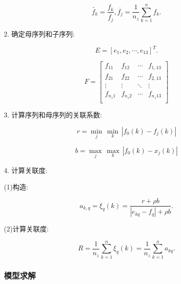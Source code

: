 \begin{equation}
    \widetilde{{{f}_{k}}}=\frac{{{f}_{k}}}{\overline{{{f}_{j}}}},\overline{{{f}_{j}}}=\frac{1}{{{n}_{z}}}\sum\limits_{k=1}^{n}{{{f}_{k}}}.
\end{equation}

2. 确定母序列和子序列:

\begin{equation}
    E={{\left[ {{e}_{1}},{{e}_{2}},\cdots ,{{e}_{13}} \right]}^{T}}.
\end{equation}

\begin{equation}
    F=\left[ \begin{matrix}
		{{f}_{11}} & {{f}_{12}} & \cdots  & {{f}_{1,13}}  \\
		{{f}_{21}} & {{f}_{22}} & \cdots  & {{f}_{2,13}}  \\
		\vdots  & \vdots  & \ddots  & \vdots   \\
		{{f}_{{{n}_{z}}1}} & {{f}_{{{n}_{z}}2}} & \cdots  & {{f}_{{{n}_{z}}13}}  \\
	\end{matrix} \right]
\end{equation}

3. 计算序列和母序列的关联系数:


\begin{equation}
    r=\underset{j}{\mathop{\min }}\,\underset{k}{\mathop{\min }}\,|{{f}_{0}}(k)-{{f}_{j}}(k)|
\end{equation}

\begin{equation}
    b=\underset{j}{\mathop{\max }}\,\underset{k}{\mathop{\max }}\,|{{f}_{0}}(k)-{{x}_{j}}(k)|
\end{equation}

4. 计算关联度:

(1)构造:

\begin{equation}
    {{a}_{k,q}}={{\xi }_{q}}(k)=\frac{r+\rho b}{|{{e}_{kq}}-{{f}_{q}}|+\rho b}.
\end{equation}

(2)计算关联度:

\begin{equation}
    R=\frac{1}{{{n}_{z}}}\sum\limits_{k=1}^{n}{{{\xi }_{q}}(k)}=\frac{1}{{{n}_{z}}}\sum\limits_{k=1}^{n}{{{a}_{kq}}}.
\end{equation}

\subsubsection{模型求解}

